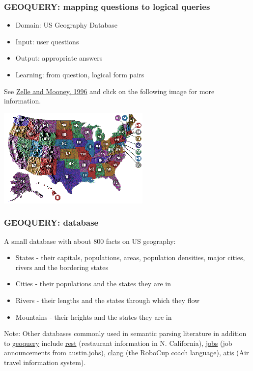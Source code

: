 \documentclass[ignorenonframetext]{beamer}
\begin{document}
\begin{frame}\frametitle{GEOQUERY: mapping questions to logical queries}

\begin{itemize}
\item Domain: US Geography Database
\item Input: user questions
\item Output: appropriate answers
\item Learning: from question, logical form pairs
\end{itemize}

See \href{http://aaaipress.org/Papers/AAAI/1996/AAAI96-156.pdf}{Zelle
  and Mooney, 1996}
and click on the following image for more information.

\begin{center}
\href{http://www.cs.utexas.edu/users/ml/geo.html}{
\includegraphics[width=.6\textwidth]{images/us-states.png}}
\end{center}

\end{frame}

\begin{frame}\frametitle{GEOQUERY: database}
A small database with about 800 facts on US geography:
\begin{itemize}
\item States - their capitals, populations, areas, population densities,
major cities, rivers and the bordering states
\item Cities - their populations and the states they are in
\item Rivers - their lengths and the states through which they flow
\item Mountains - their heights and the states they are in
\end{itemize}
\vspace*{1cm}
Note: Other databases commonly used in semantic parsing literature in addition to
\href{http://www.cs.utexas.edu/users/ml/nldata/geo.html}{\sc geoquery} include
\href{http://www.cs.utexas.edu/users/ml/nldata/restquery.html}{\sc rest} (restaurant information in N. California),
\href{http://www.cs.utexas.edu/users/ml/nldata/jobquery.html}{\sc jobs} (job announcements from austin.jobs),
\href{http://www.cs.utexas.edu/users/ml/nldata/clang.html}{\sc clang} (the RoboCup coach language),
\href{http://www.ldc.upenn.edu/Catalog/docs/LDC93S4B/corpus.html}{\sc atis} (Air travel information system).
\end{frame}
\end{document}
